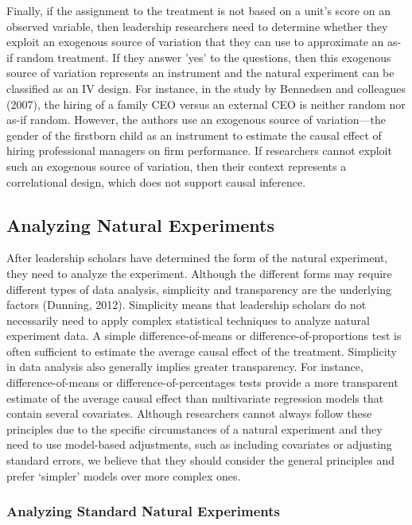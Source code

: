 \documentclass[english]{article}
\begin{document}
Finally, if the assignment to the treatment is not based on a unit's
score on an observed variable, then leadership researchers need to
determine whether they exploit an exogenous source of variation that
they can use to approximate an as-if random treatment. If they answer
'yes' to the questions, then this exogenous source of variation
represents an instrument and the natural experiment can be classified as
an IV design. For instance, in the study by Bennedsen and colleagues
(2007), the hiring of a family CEO versus an external CEO is neither
random nor as-if random. However, the authors use an exogenous source of
variation---the gender of the firstborn child as an instrument to
estimate the causal effect of hiring professional managers on firm
performance. If researchers cannot exploit such an exogenous source of
variation, then their context represents a correlational design, which
does not support causal inference.


\subsection{Analyzing Natural Experiments}

\noindent After leadership scholars have determined the form of the natural
experiment, they need to analyze the experiment. Although the different
forms may require different types of data analysis, simplicity and
transparency are the underlying factors (Dunning, 2012). Simplicity
means that leadership scholars do not necessarily need to apply complex
statistical techniques to analyze natural experiment data. A simple
difference-of-means or difference-of-proportions test is often
sufficient to estimate the average causal effect of the treatment.
Simplicity in data analysis also generally implies greater transparency.
For instance, difference-of-means or difference-of-percentages tests
provide a more transparent estimate of the average causal effect than
multivariate regression models that contain several covariates. Although
researchers cannot always follow these principles due to the specific
circumstances of a natural experiment and they need to use model-based
adjustments, such as including covariates or adjusting standard errors,
we believe that they should consider the general principles and prefer
`simpler' models over more complex ones.

\subsubsection{Analyzing Standard Natural Experiments}
\end{document}

